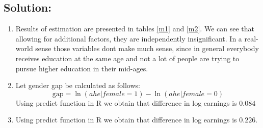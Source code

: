 \documentclass[10pt,a4paper]{amsart}
\begin{document}
\subsection*{Solution:}
\begin{enumerate}
      \item Results of estimation are presented in tables \ref{m1} and \ref{m2}. We can see that allowing for
            additional factors, they are independently insignificant. In a real-world sense 
            those variables dont make much sense, since in general everybody receives education at the
            same age and not a lot of people are trying to pursue higher education in their mid-ages.
      \item Let gender gap be calculated as follows:
            \[
                  \text{gap} = \ln(ahe | female =1) - \ln (ahe | female =0 )
            \]
            Using predict function in R we obtain that difference in log earnings is $ 0.084 $
      \item Using predict function in R we obtain that difference in log earnings is $ 0.226 $.



\end{enumerate}
\end{document}
